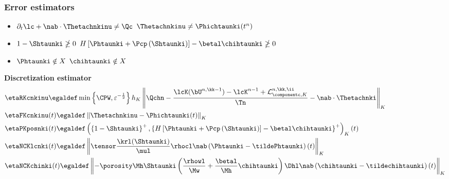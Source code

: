 \documentclass[10 pt]{beamer}
\begin{document}
\begin{frame}
\frametitle{Error estimators}


\begin{itemize}
\item $\partial_t \lc + \nab \cdot \Thetachnkinu \neq \Qc$ \quad $\Thetachnkinu \neq \Phichtaunki(t^n)$
\item $1 - \Shtaunki \ngeq 0$ \quad $H\left[\Phtaunki + \Pcp\left(\Shtaunki\right)\right]-\betal \chihtaunki \ngeq 0$ 
 \item $\Phtaunki \notin X$ \quad $\chihtaunki \notin X$
\end{itemize}
\pause
\textcolor{cadmiumgreen}{\textbf{Discretization estimator}}
\begin{equation*}
\begin{split}
&\etaRKcnkinu \egaldef \min\left\{\CPW,\varepsilon^{-\frac{1}{2}}\right\} h_K \left\|\Qchn - \frac{\lcK(\bU^{n,\kk-1}) - \lcK^{n-1} + \mathcal{L}_{\componentc,K}^{n,\kk,\ii}}{\Tn} - \nab \cdot \Thetachnki \right\|_K \\
&\etaFKcnkinu(t) \egaldef \left\|\Thetachnkinu - \Phichtaunki(t) \right\|_K\\
&\etaPKposnki(t) \egaldef \left(\left\{1-\Shtaunki\right\}^{+},\left\{H\left[\Phtaunki + \Pcp\left(\Shtaunki\right)\right]-\betal \chihtaunki\right\}^{+}\right)_K(t)\\
&\etaNCKlcnki(t) \egaldef \left\| \tensor \frac{\krl(\Shtaunki)}{\mul} \rhocl \nab \left(\Phtaunki-\tildePhtaunki  \right)(t) \right\|_K\\
&\etaNCKchinki(t)  \egaldef \left\| -\porosity \Mh \Shtaunki \left(\frac{\rhowl}{\Mw} + \frac{\betal}{\Mh}\chihtaunki \right) \Dhl \nab \left(\chihtaunki-\tildechihtaunki \right)(t) \right\|_K
\end{split}
\end{equation*}
\end{frame}
%
\end{document}
